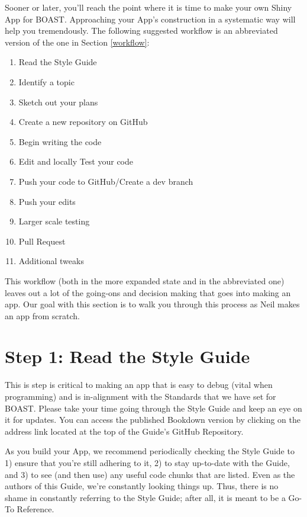 \documentclass[
]{book}
\providecommand{\tightlist}{%
  \setlength{\itemsep}{0pt}\setlength{\parskip}{0pt}}
\begin{document}
Sooner or later, you'll reach the point where it is time to make your own Shiny App for BOAST. Approaching your App's construction in a systematic way will help you tremendously. The following suggested workflow is an abbreviated version of the one in Section \ref{workflow}:

\begin{enumerate}
\def\labelenumi{\arabic{enumi}.}
\tightlist
\item
  Read the Style Guide
\item
  Identify a topic
\item
  Sketch out your plans
\item
  Create a new repository on GitHub
\item
  Begin writing the code
\item
  Edit and locally Test your code
\item
  Push your code to GitHub/Create a dev branch
\item
  Push your edits
\item
  Larger scale testing
\item
  Pull Request
\item
  Additional tweaks
\end{enumerate}

This workflow (both in the more expanded state and in the abbreviated one) leaves out a lot of the going-ons and decision making that goes into making an app. Our goal with this section is to walk you through this process as Neil makes an app from scratch.

\hypertarget{step1}{%
\section{Step 1: Read the Style Guide}\label{step1}}

This is step is critical to making an app that is easy to debug (vital when programming) and is in-alignment with the Standards that we have set for BOAST. Please take your time going through the Style Guide and keep an eye on it for updates. You can access the published Bookdown version by clicking on the address link located at the top of the Guide's GitHub Repository.

As you build your App, we recommend periodically checking the Style Guide to 1) ensure that you're still adhering to it, 2) to stay up-to-date with the Guide, and 3) to see (and then use) any useful code chunks that are listed. Even as the authors of this Guide, we're constantly looking things up. Thus, there is no shame in constantly referring to the Style Guide; after all, it is meant to be a Go-To Reference.
\end{document}
